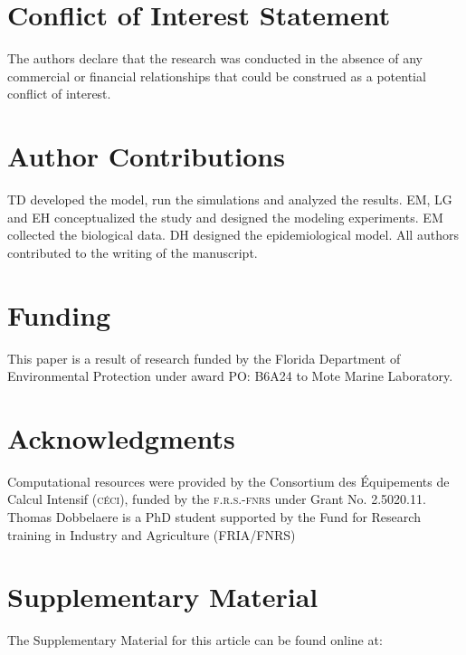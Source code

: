 \documentclass[utf8]{frontiersSCNS}
\begin{document}

\section*{Conflict of Interest Statement}
The authors declare that the research was conducted in the absence of any commercial or financial relationships that could be construed as a potential conflict of interest.

\section*{Author Contributions}
TD developed the model, run the simulations and analyzed the results. EM, LG and EH conceptualized the study and designed the modeling experiments. EM collected the biological data. DH designed the epidemiological model. All authors contributed to the writing of the manuscript.
  
\section*{Funding}
This paper is a result of research funded by the Florida Department of Environmental Protection under award PO: B6A24 to Mote Marine Laboratory. 

\section*{Acknowledgments}
Computational resources were provided by the Consortium des \'Equipements de Calcul Intensif (\textsc{c\'eci}), funded by the \textsc{f.r.s.-fnrs} under Grant No. 2.5020.11. Thomas Dobbelaere is a PhD student supported by the Fund for Research training in Industry and Agriculture (\textsc{FRIA}/\textsc{FNRS})

\section*{Supplementary Material}
The Supplementary Material for this article can be found online at: 

 



\end{document}
